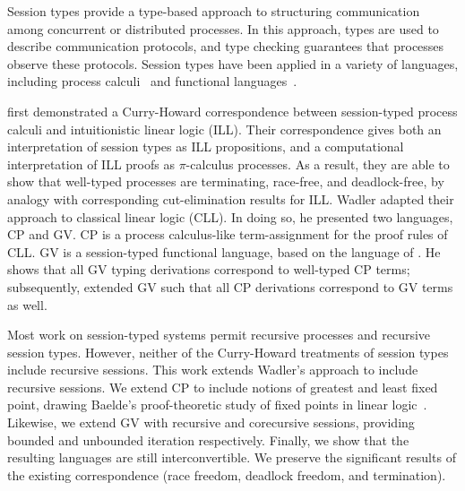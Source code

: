 \documentclass[orivec,envcountsame]{llncs}
\begin{document}
Session types provide a type-based approach to structuring communication among concurrent or
distributed processes.  In this approach, types are used to describe communication protocols, and
type checking guarantees that processes observe these protocols.  Session types have been applied in
a variety of languages, including process calculi~\citep{Honda93,Honda98} and functional
languages~\citep{GayVasconcelos10}.

\citet{CairesPfenning10} first demonstrated a Curry-Howard correspondence between
session-typed process calculi and intuitionistic linear logic (ILL).  Their correspondence gives
both an interpretation of session types as ILL propositions, and a computational interpretation of
ILL proofs as $\pi$-calculus processes.  As a result, they are able to show that well-typed
processes are terminating, race-free, and deadlock-free, by analogy with corresponding
cut-elimination results for ILL.  Wadler adapted their approach to classical linear logic (CLL).  In
doing so, he presented two languages, CP and GV.  CP is a process calculus-like term-assignment for
the proof rules of CLL.  GV is a session-typed functional language, based on the language of
\citet{GayVasconcelos10}.  He shows that all GV typing derivations correspond to
well-typed CP terms; subsequently, \cite{LindleyM14} extended GV such that all CP derivations
correspond to GV terms as well.

Most work on session-typed systems permit recursive processes and recursive session types.  However,
neither of the Curry-Howard treatments of session types include recursive sessions.  This work
extends Wadler's approach to include recursive sessions.  We extend CP to include notions of
greatest and least fixed point, drawing Baelde's proof-theoretic study of fixed points in linear
logic~\citep{Baelde12}.  Likewise, we extend GV with recursive and corecursive sessions, providing
bounded and unbounded iteration respectively.  Finally, we show that the resulting languages are
still interconvertible.  We preserve the significant results of the existing correspondence (race
freedom, deadlock freedom, and termination).
\end{document}
